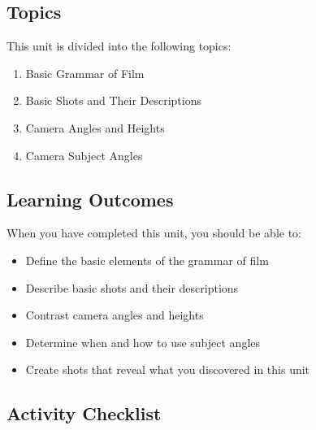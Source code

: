\documentclass[
]{book}
\providecommand{\tightlist}{%
  \setlength{\itemsep}{0pt}\setlength{\parskip}{0pt}}
\begin{document}
\hypertarget{topics-4}{%
\subsection*{Topics}\label{topics-4}}

This unit is divided into the following topics:

\begin{enumerate}
\def\labelenumi{\arabic{enumi}.}
\tightlist
\item
  Basic Grammar of Film\\
\item
  Basic Shots and Their Descriptions\\
\item
  Camera Angles and Heights\\
\item
  Camera Subject Angles
\end{enumerate}

\hypertarget{learning-outcomes-4}{%
\subsection*{Learning Outcomes}\label{learning-outcomes-4}}

When you have completed this unit, you should be able to:

\begin{itemize}
\tightlist
\item
  Define the basic elements of the grammar of film\\
\item
  Describe basic shots and their descriptions\\
\item
  Contrast camera angles and heights\\
\item
  Determine when and how to use subject angles\\
\item
  Create shots that reveal what you discovered in this unit
\end{itemize}

\hypertarget{activity-checklist-4}{%
\subsection*{Activity Checklist}\label{activity-checklist-4}}
\end{document}
